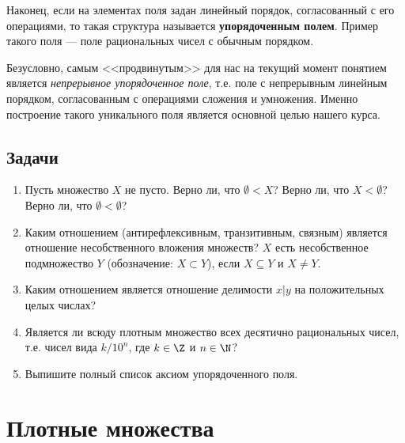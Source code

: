 \begin{enumerate}
Наконец, если на элементах поля задан линейный порядок, согласованный с его операциями, то такая структура называется \textbf{упорядоченным полем}. Пример такого поля --- поле рациональных чисел с обычным порядком.

Безусловно, самым <<продвинутым>> для нас на текущий момент понятием является \textit{непрерывное упорядоченное поле}, т.е. поле с непрерывным линейным порядком, согласованным с операциями сложения и умножения. Именно построение такого уникального поля является основной целью нашего курса.
\end{enumerate}

\subsection*{Задачи}

\begin{enumerate}
\item Пусть множество $X$ не пусто. Верно ли, что $\emptyset<X$? Верно ли, что $X<\emptyset$? Верно ли, что $\emptyset<\emptyset$?
\item Каким отношением (антирефлексивным, транзитивным, связным) является отношение несобственного вложения множеств? $X$ есть несобственное подмножество $Y$ (обозначение: $X\subset Y$), если $X\subseteq Y$ и $X\ne Y$.
\item Каким отношением является отношение делимости $x|y$ на положительных целых числах?
\item Является ли всюду плотным множество всех десятично рациональных чисел, т.е. чисел вида $k/10^n$, где $k\in \Z$ и $n\in\N$?
\item Выпишите полный список аксиом упорядоченного поля.
\end{enumerate}


\section{Плотные множества}


